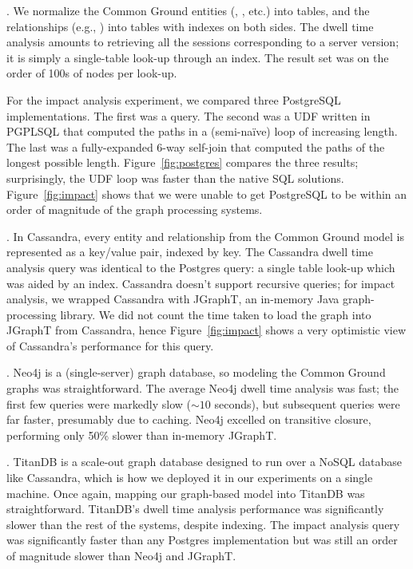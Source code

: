 \documentclass{sig-alternate}
\begin{document}
. We normalize the Common Ground entities 
(\itemground, \version, etc.) into tables, and the relationships
(e.g., ) into tables with indexes on both sides. 
The dwell time analysis amounts to retrieving all the sessions corresponding to a server version; it is simply a single-table look-up through an index. The result set was on the order of 100s of nodes per look-up.

For the impact analysis experiment, we compared three PostgreSQL implementations. The first was a  query. 
The second was a UDF written in PGPLSQL that computed the paths in a (semi-naïve) loop of increasing length. 
The last was a fully-expanded 6-way self-join that computed the paths of the longest possible length. Figure~\ref{fig:postgres} compares the three results; surprisingly, the UDF loop was faster than the native SQL solutions. 
Figure~\ref{fig:impact} shows that we were unable to get PostgreSQL to be within an order of magnitude of the graph processing systems. 

. In Cassandra, every entity and relationship from the Common Ground model is represented as a key/value pair, indexed by key. 
The Cassandra dwell time analysis query was identical to the Postgres query: a single table look-up which was aided by an index.
Cassandra doesn't support recursive queries; for impact analysis, we wrapped Cassandra with JGraphT, an in-memory Java graph-processing library. We did not count the time taken to load the graph into JGraphT from Cassandra, hence Figure~\ref{fig:impact} shows a very optimistic view of Cassandra's performance for this query.

. Neo4j is a (single-server) graph database, so modeling the Common Ground graphs was straightforward.
The average Neo4j dwell time analysis was fast; the first few queries were markedly slow
(${\sim}10$ seconds),
but subsequent queries were far faster, presumably due to caching. 
Neo4j excelled on transitive closure, performing only 50\% slower than in-memory JGraphT.

. TitanDB is a scale-out graph database designed to run over a NoSQL database like Cassandra, which is how we deployed it in our experiments on a single machine. %
Once again, mapping our graph-based model into TitanDB was straightforward.
TitanDB's dwell time analysis performance was significantly slower than the rest of the systems, despite indexing.
The impact analysis query was significantly faster than any Postgres implementation but was still an order of magnitude slower than Neo4j and JGraphT. 
\end{document}
